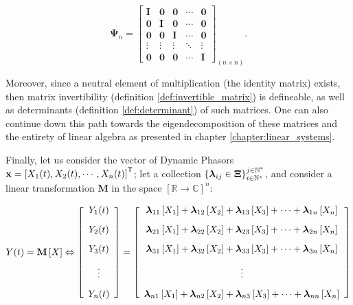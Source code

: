 \begin{equation} \boldsymbol{\Psi}_n = \left[\begin{array}{ccccc} \mathbf{I} & \mathbf{0} & \mathbf{0} & \cdots & \mathbf{0} \\[3mm] \mathbf{0} & \mathbf{I} & \mathbf{0} & \cdots & \mathbf{0} \\[3mm] \mathbf{0} & \mathbf{0} & \mathbf{I} & \cdots & \mathbf{0} \\[3mm] \vdots & \vdots & \vdots & \ddots & \vdots \\[3mm] \mathbf{0} & \mathbf{0} & \mathbf{0} & \cdots & \mathbf{I} \end{array}\right]_{(n\times n)} .\end{equation}

	Moreover, since a neutral element of multiplication (the identity matrix) exists, then matrix invertibility (definition \ref{def:invertible_matrix}) is defineable, as well as determinants (definition \ref{def:determinant}) of such matrices. One can also continue down this path towards the eigendecomposition of these matrices and the entirety of linear algebra as presented in chapter \ref{chapter:linear_systems}.

	Finally, let us consider the vector of Dynamic Phasors $\mathbf{x} = \left[X_1(t),X_2(t),\cdots,X_n(t)\right]^{\mathsf{T}}$; let a collection $\left\{\boldsymbol{\lambda}_{ij}\in\boldsymbol{\Xi}\right\}_{i\in\mathbb{N}^*}^{j\in\mathbb{N}^*}$, and consider a linear transformation $\mathbf{M}$ in the space $\left[\mathbb{R}\to\mathbb{C}\right]^n$:

\begin{equation}
Y(t) = \mathbf{M}\left[X\right] \Leftrightarrow \left[\begin{array}{c} Y_1(t) \\[3mm] Y_2(t) \\[3mm] Y_3(t) \\[3mm] \vdots \\[3mm] Y_n(t) \end{array}\right] =
%
\left[\begin{array}{c}
	\dpL_{11}\left[X_1\right] + \dpL_{12}\left[X_2\right] + \dpL_{13}\left[X_3\right] + \cdots + \dpL_{1n}\left[X_n\right] \\[3mm]
	\dpL_{21}\left[X_1\right] + \dpL_{22}\left[X_2\right] + \dpL_{23}\left[X_3\right] + \cdots + \dpL_{2n}\left[X_n\right] \\[3mm]
	\dpL_{31}\left[X_1\right] + \dpL_{32}\left[X_2\right] + \dpL_{33}\left[X_3\right] + \cdots + \dpL_{3n}\left[X_n\right] \\[3mm]
	\vdots \\[3mm]
	\dpL_{n1}\left[X_1\right] + \dpL_{n2}\left[X_2\right] + \dpL_{n3}\left[X_3\right] + \cdots + \dpL_{nn}\left[X_n\right]
\end{array}\right] \label{eq:proposal_application}
\end{equation}

